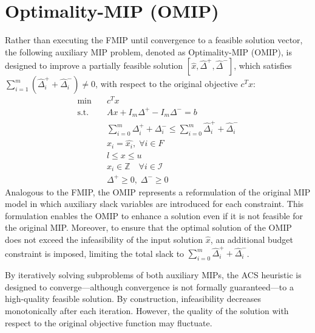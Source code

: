 \section{Optimality-MIP (OMIP)}
Rather than executing the FMIP until convergence to a feasible solution vector, the following auxiliary MIP problem, denoted as Optimality-MIP (OMIP), is designed to improve a partially feasible solution $[\hat{x}, \hat{\Delta}^+, \hat{\Delta}^-]$, which satisfies $\sum_{i=1}^m (\hat{\Delta}_i^+ + \hat{\Delta}_i^-) \neq 0$, with respect to the original objective $c^T x$:
\begin{align*}
\text{min} \quad & c^T x \\ \text{s.t.} \quad & Ax + I_m\Delta^+ - I_m\Delta^- = b\\ & \sum_{i=0}^m \Delta_i^{+}+\Delta_i^{-} \le \sum_{i=0}^m \hat\Delta_i^{+}+\hat\Delta_i^{-}\\ & x_i = \hat{x_i}, \; \forall i \in F\\ & l \le x \le u\\ & x_i \in \mathbb{Z} \quad \forall i \in \mathcal{I} \\ & \Delta^+ \ge 0, \; \Delta^- \ge 0 \end{align*} Analogous to the FMIP, the OMIP represents a reformulation of the original MIP model in which auxiliary slack variables are introduced for each constraint. This formulation enables the OMIP to enhance a solution even if it is not feasible for the original MIP. Moreover, to ensure that the optimal solution of the OMIP does not exceed the infeasibility of the input solution $\hat{x}$, an additional budget constraint is imposed, limiting the total slack to $\sum_{i=0}^m \hat\Delta_i^{+}+\hat\Delta_i^{-}$.

By iteratively solving subproblems of both auxiliary MIPs, the ACS heuristic is designed to converge—although convergence is not formally guaranteed—to a high-quality feasible solution. By construction, infeasibility decreases monotonically after each iteration. However, the quality of the solution with respect to the original objective function may fluctuate.

